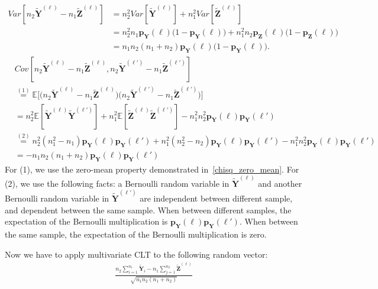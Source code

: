\documentclass[11pt]{article} %
\newcommand{\vecBold}[1]{\boldsymbol{#1}} %
\newcommand{\distparamMultinom}{\boldsymbol{p}}
\newcommand{\mE}{\mathbb{E}} %
\newcommand{\rvY}{Y}
\newcommand{\rVecY}{\vecBold{\rvY}}
\newcommand{\rvZ}{Z}
\newcommand{\rVecZ}{\vecBold{\rvZ}}
\begin{document}
\begin{align*}
	Var[
n_2
		\tilde{\rVecY}^{(\ell)}
		-
		n_1
		\tilde{\rVecZ}^{(\ell)}	
	]
&=
n_2^2
	Var[
		\tilde{\rVecY}^{(\ell)}]
+		
n_1^2
Var[
\tilde{\rVecZ}^{(\ell)}	
	]
	\\
	&=
n_2^2 n_1
\distparamMultinom_{\rVecY}(\ell)
\bigl(
1-\distparamMultinom_{\rVecY}(\ell)
\bigr)
+		
n_1^2 n_2
\distparamMultinom_{\rVecZ}(\ell)
\bigl(
1-\distparamMultinom_{\rVecZ}(\ell)
\bigr)
\\&=
n_1n_2(n_1+n_2)
\distparamMultinom_{\rVecY}(\ell)
\bigl(
1-\distparamMultinom_{\rVecY}(\ell)
\bigr).
\end{align*}
%
\begin{align*}
	&
	Cov[
n_2\tilde{\rVecY}^{(\ell)}
		-
		n_1
		\tilde{\rVecZ}^{(\ell)}
,
n_2\tilde{\rVecY}^{(\ell')}
		-
		n_1
		\tilde{\rVecZ}^{(\ell')}	
	]
\\&\stackrel{(1)}{=}
\mE
\bigl[
\bigl(
n_2\tilde{\rVecY}^{(\ell)}
		-
		n_1
		\tilde{\rVecZ}^{(\ell)}
\bigr)
\bigl(
n_2\tilde{\rVecY}^{(\ell')}
		-
		n_1
		\tilde{\rVecZ}^{(\ell')}
\bigr)
\bigr]
\\&=
n_2^2\mE[\tilde{\rVecY}^{(\ell)} \tilde{\rVecY}^{(\ell')}]
+
n_1^2\mE[\tilde{\rVecZ}^{(\ell)} \tilde{\rVecZ}^{(\ell')}]
-n_1^2 n_2^2
\distparamMultinom_{\rVecY}(\ell)
\distparamMultinom_{\rVecY}(\ell')
%
\\&\stackrel{(2)}{=}
n_2^2(n_1^2 - n_1)
\distparamMultinom_{\rVecY}(\ell)
\distparamMultinom_{\rVecY}(\ell')
+
n_1^2 (n_2^2 - n_2)
\distparamMultinom_{\rVecY}(\ell)
\distparamMultinom_{\rVecY}(\ell')
-n_1^2 n_2^2
\distparamMultinom_{\rVecY}(\ell)
\distparamMultinom_{\rVecY}(\ell')
\\&=
-n_1n_2(n_1+n_2)\distparamMultinom_{\rVecY}(\ell)
\distparamMultinom_{\rVecY}(\ell')
\end{align*}
For (1), we use the zero-mean property demonstrated in~\eqref{chisq_zero_mean}.
For (2), we use the following facts: a Bernoulli random variable in $\tilde{\rVecY}^{(\ell)}$ and another Bernoulli random variable in $\tilde{\rVecY}^{(\ell')}$ are independent between different sample, and dependent between the same sample. When between different samples, the expectation of the Bernoulli multiplication is  $\distparamMultinom_{\rVecY}(\ell)
\distparamMultinom_{\rVecY}(\ell')$.
 When between the same sample, the expectation of the Bernoulli multiplication is zero.
 
 Now we have to apply multivariate CLT to the following random vector:
 \begin{align*}
		\frac{
		n_2
		\sum_{i=1}^{n_1}
		\tilde{\rVecY}_i
		-
		n_1
		\sum_{j=1}^{n_2}
		\tilde{\rVecZ}^{(\ell)}
		}{
		\sqrt{n_1 n_2 (n_1 + n_2) }
		} 	
 \end{align*}


\end{document}
